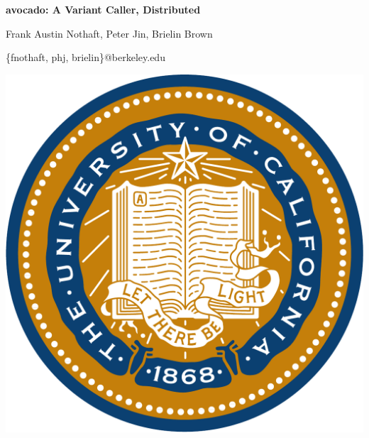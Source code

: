 \documentclass[11pt]{a0poster}
\date{}
\begin{document}
\begin{minipage}{0.887\linewidth}
\vspace{100pt}
\hspace{100pt}
\color{Blue}
{\fontsize{3cm}{1em} \bf avocado: A Variant Caller, Distributed}

\hspace{100pt}
\huge Frank Austin Nothaft, Peter Jin, Brielin Brown

\hspace{100pt}
\huge \{fnothaft, phj, brielin\}@berkeley.edu
\vspace{100pt}
\end{minipage}
\begin{minipage}{0.113\linewidth}
\includegraphics[scale=0.6]{ucseal_540_139.pdf}
\end{minipage}

{\color{Blue}\noindent\makebox[\linewidth]{\rule{\paperwidth}{30pt}}}
\end{document}
